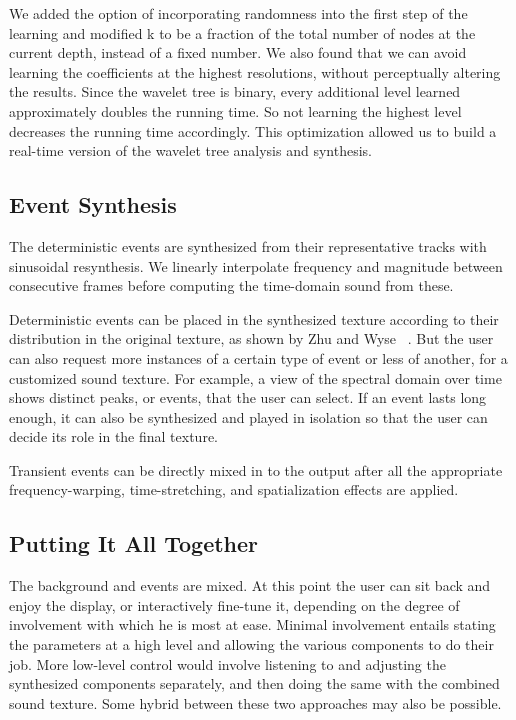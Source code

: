 \documentclass{acmsiggraph}               %
\begin{document}
We added the option of incorporating randomness into the first step of 
the learning and modified k to be a fraction of the total number of 
nodes at the current depth, instead of a fixed number. We also found 
that we can avoid learning the coefficients at the highest resolutions, 
without perceptually altering the results. Since the wavelet tree is binary, every additional 
level learned approximately doubles the running time. So not learning the highest level 
decreases the running time accordingly. This optimization allowed us 
to build a real-time version of the wavelet tree analysis and synthesis. 


\subsection{Event Synthesis}

The deterministic events are synthesized from their representative tracks with 
sinusoidal resynthesis. We linearly interpolate frequency and magnitude 
between consecutive frames before computing the time-domain sound from 
these. 

Deterministic events can be placed in the synthesized texture according to their 
distribution in the original texture, as shown by Zhu and Wyse 
~. But the user can also request more instances of a 
certain type of event or less of another, for a customized sound 
texture.  For example, a view of the spectral domain over time shows 
distinct peaks, or events, that the user can select. If an event lasts 
long enough, it can also be synthesized and played in isolation so that 
the user can decide its role in the final texture.

Transient events can be directly mixed in to the output after all the appropriate
frequency-warping, time-stretching, and spatialization effects are applied.


\subsection{Putting It All Together}

The background and events are mixed. At this point the user can sit back and enjoy 
the display, or interactively fine-tune it, depending on the degree of involvement with which 
he is most at ease. Minimal involvement entails stating the parameters at a high level and 
allowing the various components to do their job. More low-level control would involve 
listening to and adjusting the synthesized components separately, and then doing the same with 
the combined sound texture. Some hybrid between these two approaches may also be possible.
\end{document}
